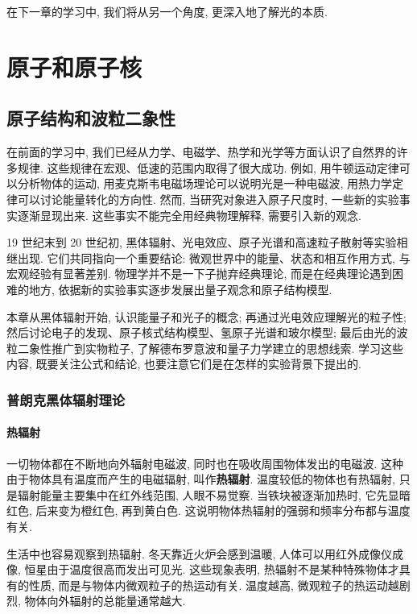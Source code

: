 \documentclass[11pt,a4paper]{ctexbook}
\begin{document}
在下一章的学习中, 我们将从另一个角度, 更深入地了解光的本质.




\part{原子和原子核}
\chapter{原子结构和波粒二象性}

在前面的学习中, 我们已经从力学、电磁学、热学和光学等方面认识了自然界的许多规律. 这些规律在宏观、低速的范围内取得了很大成功. 例如, 用牛顿运动定律可以分析物体的运动, 用麦克斯韦电磁场理论可以说明光是一种电磁波, 用热力学定律可以讨论能量转化的方向性. 然而, 当研究对象进入原子尺度时, 一些新的实验事实逐渐显现出来. 这些事实不能完全用经典物理解释, 需要引入新的观念.

19 世纪末到 20 世纪初, 黑体辐射、光电效应、原子光谱和高速粒子散射等实验相继出现. 它们共同指向一个重要结论: 微观世界中的能量、状态和相互作用方式, 与宏观经验有显著差别. 物理学并不是一下子抛弃经典理论, 而是在经典理论遇到困难的地方, 依据新的实验事实逐步发展出量子观念和原子结构模型.

本章从黑体辐射开始, 认识能量子和光子的概念; 再通过光电效应理解光的粒子性; 然后讨论电子的发现、原子核式结构模型、氢原子光谱和玻尔模型; 最后由光的波粒二象性推广到实物粒子, 了解德布罗意波和量子力学建立的思想线索. 学习这些内容, 既要关注公式和结论, 也要注意它们是在怎样的实验背景下提出的.

\section{普朗克黑体辐射理论}

\subsection{热辐射}

一切物体都在不断地向外辐射电磁波, 同时也在吸收周围物体发出的电磁波. 这种由于物体具有温度而产生的电磁辐射, 叫作\textbf{热辐射}. 温度较低的物体也有热辐射, 只是辐射能量主要集中在红外线范围, 人眼不易觉察. 当铁块被逐渐加热时, 它先显暗红色, 后来变为橙红色, 再到黄白色. 这说明物体热辐射的强弱和频率分布都与温度有关.

生活中也容易观察到热辐射. 冬天靠近火炉会感到温暖, 人体可以用红外成像仪成像, 恒星由于温度很高而发出可见光. 这些现象表明, 热辐射不是某种特殊物体才具有的性质, 而是与物体内微观粒子的热运动有关. 温度越高, 微观粒子的热运动越剧烈, 物体向外辐射的总能量通常越大.
\end{document}
